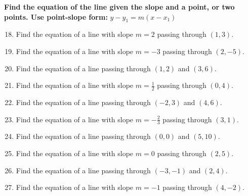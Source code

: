 \documentclass[12pt]{article}
\begin{document}
\noindent\textbf{Find the equation of the line given the slope and a point, or two points. Use point-slope form: } $y - y_1 = m(x - x_1)$

\begin{enumerate}
\setcounter{enumi}{17}

\item Find the equation of a line with slope $m = 2$ passing through $(1, 3)$.

\vspace{1.2cm}

\item Find the equation of a line with slope $m = -3$ passing through $(2, -5)$.

\vspace{1.2cm}

\item Find the equation of a line passing through $(1, 2)$ and $(3, 6)$.

\vspace{1.2cm}

\item Find the equation of a line with slope $m = \frac{1}{2}$ passing through $(0, 4)$.

\vspace{1.2cm}

\item Find the equation of a line passing through $(-2, 3)$ and $(4, 6)$.

\vspace{1.2cm}

\item Find the equation of a line with slope $m = -\frac{2}{3}$ passing through $(3, 1)$.

\vspace{1.2cm}

\item Find the equation of a line passing through $(0, 0)$ and $(5, 10)$.

\vspace{1.2cm}

\item Find the equation of a line with slope $m = 0$ passing through $(2, 5)$.

\vspace{1.2cm}

\item Find the equation of a line passing through $(-3, -1)$ and $(2, 4)$.

\vspace{1.2cm}

\item Find the equation of a line with slope $m = -1$ passing through $(4, -2)$.

\vspace{1.2cm}

\end{enumerate}
\end{document}
